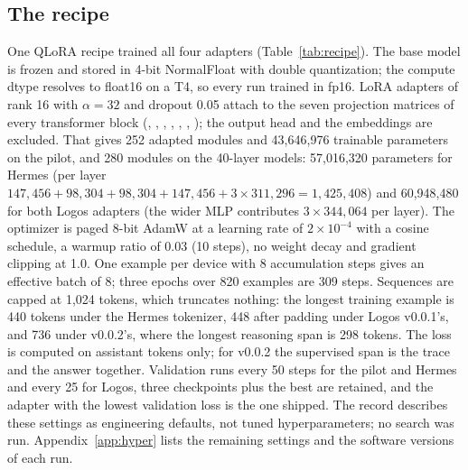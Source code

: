 \subsection{The recipe}
One QLoRA recipe \citep{dettmers2023qlora,hu2022lora} trained all four adapters (Table~\ref{tab:recipe}). The base model is frozen and stored in 4-bit NormalFloat with double quantization; the compute dtype resolves to float16 on a T4, so every run trained in fp16. LoRA adapters of rank 16 with $\alpha = 32$ and dropout 0.05 attach to the seven projection matrices of every transformer block (, , , , , , ); the output head and the embeddings are excluded. That gives 252 adapted modules and 43,646,976 trainable parameters on the pilot, and 280 modules on the 40-layer models: 57,016,320 parameters for Hermes (per layer $147{,}456 + 98{,}304 + 98{,}304 + 147{,}456 + 3 \times 311{,}296 = 1{,}425{,}408$) and 60,948,480 for both Logos adapters (the wider MLP contributes $3 \times 344{,}064$ per layer). The optimizer is paged 8-bit AdamW \citep{dettmers2022optimizers} at a learning rate of $2 \times 10^{-4}$ with a cosine schedule, a warmup ratio of 0.03 (10 steps), no weight decay and gradient clipping at 1.0. One example per device with 8 accumulation steps gives an effective batch of 8; three epochs over 820 examples are 309 steps. Sequences are capped at 1,024 tokens, which truncates nothing: the longest training example is 440 tokens under the Hermes tokenizer, 448 after padding under Logos v0.0.1's, and 736 under v0.0.2's, where the longest reasoning span is 298 tokens. The loss is computed on assistant tokens only; for v0.0.2 the supervised span is the trace and the answer together. Validation runs every 50 steps for the pilot and Hermes and every 25 for Logos, three checkpoints plus the best are retained, and the adapter with the lowest validation loss is the one shipped. The record describes these settings as engineering defaults, not tuned hyperparameters; no search was run. Appendix~\ref{app:hyper} lists the remaining settings and the software versions of each run.

